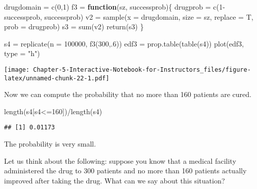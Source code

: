 \documentclass[
]{article}
\newenvironment{Shaded}{\begin{snugshade}}{\end{snugshade}}
\newcommand{\AttributeTok}[1]{\textcolor[rgb]{0.77,0.63,0.00}{#1}}
\newcommand{\ControlFlowTok}[1]{\textcolor[rgb]{0.13,0.29,0.53}{\textbf{#1}}}
\newcommand{\DecValTok}[1]{\textcolor[rgb]{0.00,0.00,0.81}{#1}}
\newcommand{\FunctionTok}[1]{\textcolor[rgb]{0.00,0.00,0.00}{#1}}
\newcommand{\NormalTok}[1]{#1}
\newcommand{\OtherTok}[1]{\textcolor[rgb]{0.56,0.35,0.01}{#1}}
\newcommand{\SpecialCharTok}[1]{\textcolor[rgb]{0.00,0.00,0.00}{#1}}
\newcommand{\StringTok}[1]{\textcolor[rgb]{0.31,0.60,0.02}{#1}}
\begin{document}
\begin{Shaded}
\begin{Highlighting}[]
\NormalTok{drugdomain }\OtherTok{=} \FunctionTok{c}\NormalTok{(}\DecValTok{0}\NormalTok{,}\DecValTok{1}\NormalTok{)}
\NormalTok{f3 }\OtherTok{=} \ControlFlowTok{function}\NormalTok{(sz, successprob)\{}
\NormalTok{  drugprob }\OtherTok{=} \FunctionTok{c}\NormalTok{(}\DecValTok{1}\SpecialCharTok{{-}}\NormalTok{successprob, successprob)}
\NormalTok{  v2 }\OtherTok{=} \FunctionTok{sample}\NormalTok{(}\AttributeTok{x =}\NormalTok{ drugdomain, }\AttributeTok{size =}\NormalTok{ sz, }\AttributeTok{replace =}\NormalTok{ T, }\AttributeTok{prob =}\NormalTok{ drugprob)}
\NormalTok{  s3 }\OtherTok{=} \FunctionTok{sum}\NormalTok{(v2)}
  \FunctionTok{return}\NormalTok{(s3)}
\NormalTok{\}}

\NormalTok{s4 }\OtherTok{=} \FunctionTok{replicate}\NormalTok{(}\AttributeTok{n =} \DecValTok{100000}\NormalTok{, }\FunctionTok{f3}\NormalTok{(}\DecValTok{300}\NormalTok{,.}\DecValTok{6}\NormalTok{))}
\NormalTok{edf3 }\OtherTok{=} \FunctionTok{prop.table}\NormalTok{(}\FunctionTok{table}\NormalTok{(s4))}
\FunctionTok{plot}\NormalTok{(edf3, }\AttributeTok{type =} \StringTok{"h"}\NormalTok{)}
\end{Highlighting}
\end{Shaded}

\texttt{[image: Chapter-5-Interactive-Notebook-for-Instructors\_files/figure-latex/unnamed-chunk-22-1.pdf]}

Now we can compute the probability that no more than 160 patients are
cured.

\begin{Shaded}
\begin{Highlighting}[]
\FunctionTok{length}\NormalTok{(s4[s4}\SpecialCharTok{\textless{}=}\DecValTok{160}\NormalTok{])}\SpecialCharTok{/}\FunctionTok{length}\NormalTok{(s4)}
\end{Highlighting}
\end{Shaded}

\begin{verbatim}
## [1] 0.01173
\end{verbatim}

The probability is very small.

Let us think about the following: suppose you know that a medical
facility administered the drug to 300 patients and no more than 160
patients actually improved after taking the drug. What can we say about
this situation?
\end{document}
